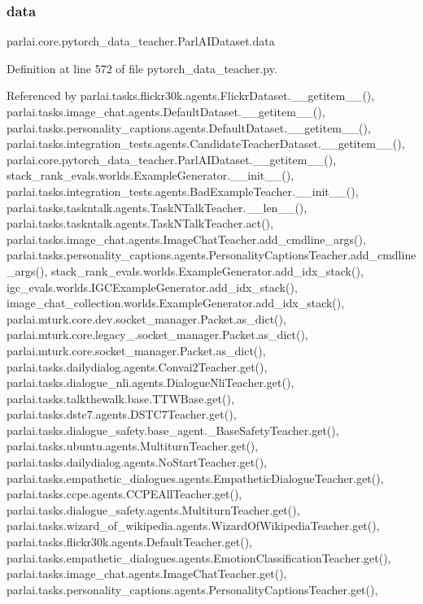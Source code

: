 \subsubsection{\texorpdfstring{data}{data}}
{\footnotesize\ttfamily parlai.\+core.\+pytorch\+\_\+data\+\_\+teacher.\+Parl\+A\+I\+Dataset.\+data}



Definition at line 572 of file pytorch\+\_\+data\+\_\+teacher.\+py.



Referenced by parlai.\+tasks.\+flickr30k.\+agents.\+Flickr\+Dataset.\+\_\+\+\_\+getitem\+\_\+\+\_\+(), parlai.\+tasks.\+image\+\_\+chat.\+agents.\+Default\+Dataset.\+\_\+\+\_\+getitem\+\_\+\+\_\+(), parlai.\+tasks.\+personality\+\_\+captions.\+agents.\+Default\+Dataset.\+\_\+\+\_\+getitem\+\_\+\+\_\+(), parlai.\+tasks.\+integration\+\_\+tests.\+agents.\+Candidate\+Teacher\+Dataset.\+\_\+\+\_\+getitem\+\_\+\+\_\+(), parlai.\+core.\+pytorch\+\_\+data\+\_\+teacher.\+Parl\+A\+I\+Dataset.\+\_\+\+\_\+getitem\+\_\+\+\_\+(), stack\+\_\+rank\+\_\+evals.\+worlds.\+Example\+Generator.\+\_\+\+\_\+init\+\_\+\+\_\+(), parlai.\+tasks.\+integration\+\_\+tests.\+agents.\+Bad\+Example\+Teacher.\+\_\+\+\_\+init\+\_\+\+\_\+(), parlai.\+tasks.\+taskntalk.\+agents.\+Task\+N\+Talk\+Teacher.\+\_\+\+\_\+len\+\_\+\+\_\+(), parlai.\+tasks.\+taskntalk.\+agents.\+Task\+N\+Talk\+Teacher.\+act(), parlai.\+tasks.\+image\+\_\+chat.\+agents.\+Image\+Chat\+Teacher.\+add\+\_\+cmdline\+\_\+args(), parlai.\+tasks.\+personality\+\_\+captions.\+agents.\+Personality\+Captions\+Teacher.\+add\+\_\+cmdline\+\_\+args(), stack\+\_\+rank\+\_\+evals.\+worlds.\+Example\+Generator.\+add\+\_\+idx\+\_\+stack(), igc\+\_\+evals.\+worlds.\+I\+G\+C\+Example\+Generator.\+add\+\_\+idx\+\_\+stack(), image\+\_\+chat\+\_\+collection.\+worlds.\+Example\+Generator.\+add\+\_\+idx\+\_\+stack(), parlai.\+mturk.\+core.\+dev.\+socket\+\_\+manager.\+Packet.\+as\+\_\+dict(), parlai.\+mturk.\+core.\+legacy\+\_.\+socket\+\_\+manager.\+Packet.\+as\+\_\+dict(), parlai.\+mturk.\+core.\+socket\+\_\+manager.\+Packet.\+as\+\_\+dict(), parlai.\+tasks.\+dailydialog.\+agents.\+Convai2\+Teacher.\+get(), parlai.\+tasks.\+dialogue\+\_\+nli.\+agents.\+Dialogue\+Nli\+Teacher.\+get(), parlai.\+tasks.\+talkthewalk.\+base.\+T\+T\+W\+Base.\+get(), parlai.\+tasks.\+dstc7.\+agents.\+D\+S\+T\+C7\+Teacher.\+get(), parlai.\+tasks.\+dialogue\+\_\+safety.\+base\+\_\+agent.\+\_\+\+Base\+Safety\+Teacher.\+get(), parlai.\+tasks.\+ubuntu.\+agents.\+Multiturn\+Teacher.\+get(), parlai.\+tasks.\+dailydialog.\+agents.\+No\+Start\+Teacher.\+get(), parlai.\+tasks.\+empathetic\+\_\+dialogues.\+agents.\+Empathetic\+Dialogue\+Teacher.\+get(), parlai.\+tasks.\+ccpe.\+agents.\+C\+C\+P\+E\+All\+Teacher.\+get(), parlai.\+tasks.\+dialogue\+\_\+safety.\+agents.\+Multiturn\+Teacher.\+get(), parlai.\+tasks.\+wizard\+\_\+of\+\_\+wikipedia.\+agents.\+Wizard\+Of\+Wikipedia\+Teacher.\+get(), parlai.\+tasks.\+flickr30k.\+agents.\+Default\+Teacher.\+get(), parlai.\+tasks.\+empathetic\+\_\+dialogues.\+agents.\+Emotion\+Classification\+Teacher.\+get(), parlai.\+tasks.\+image\+\_\+chat.\+agents.\+Image\+Chat\+Teacher.\+get(), parlai.\+tasks.\+personality\+\_\+captions.\+agents.\+Personality\+Captions\+Teacher.\+get(), 